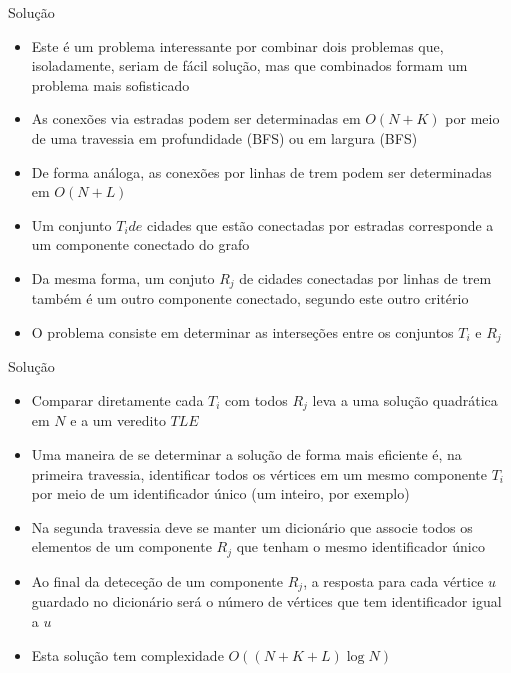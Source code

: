 \begin{frame}[fragile]{Solução}

    \begin{itemize}
        \item Este é um problema interessante por combinar dois problemas que, isoladamente,
            seriam de fácil solução, mas que combinados formam um problema mais sofisticado

        \item As conexões via estradas podem ser determinadas em $O(N + K)$ por meio de uma
            travessia em profundidade (BFS) ou em largura (BFS)

        \item De forma análoga, as conexões por linhas de trem podem ser determinadas em
            $O(N + L)$

       \item Um conjunto $T_ide $ cidades que estão conectadas por estradas corresponde a um
            componente conectado do grafo

        \item Da mesma forma, um conjuto $R_j$ de cidades conectadas por linhas de trem 
            também é um outro componente conectado, segundo este outro critério

        \item O problema consiste em determinar as interseções entre os conjuntos $T_i$ e
            $R_j$
    \end{itemize}

\end{frame}

\begin{frame}[fragile]{Solução}

    \begin{itemize}
        \item Comparar diretamente cada $T_i$ com todos $R_j$ leva a uma solução quadrática
            em $N$ e a um veredito $TLE$

        \item Uma maneira de se determinar a solução de forma mais eficiente é, na primeira
            travessia, identificar todos os vértices em um mesmo componente $T_i$ por meio
            de um identificador único (um inteiro, por exemplo)

        \item Na segunda travessia deve se manter um dicionário que associe todos os elementos
            de um componente $R_j$ que tenham o mesmo identificador único

        \item Ao final da deteceção de um componente $R_j$, a resposta para cada vértice $u$
            guardado no dicionário será o número de vértices que tem identificador igual a
            $u$

        \item Esta solução tem complexidade $O((N + K + L)\log N)$
    \end{itemize}

\end{frame}

